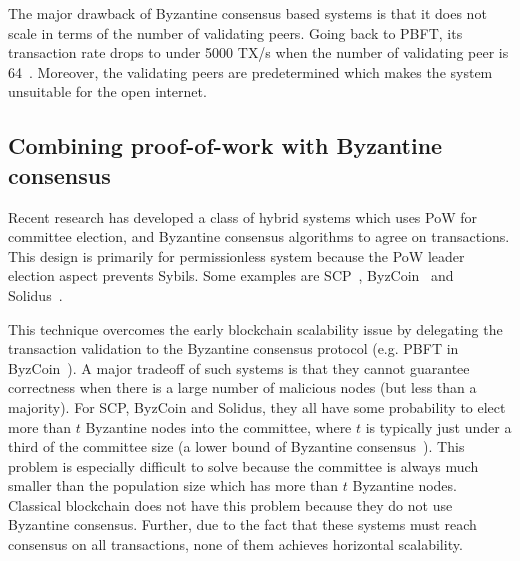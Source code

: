 The major drawback of Byzantine consensus based systems is that it does not scale in terms of the number of validating peers.
Going back to PBFT, its transaction rate drops to under 5000 TX/s when the number of validating peer is 64~\cite[Section 5.2]{miller2016honey}.
Moreover, the validating peers are predetermined which makes the system unsuitable for the open internet.



\subsection{Combining proof-of-work with Byzantine consensus}
Recent research has developed a class of hybrid systems which uses PoW for committee election,
and Byzantine consensus algorithms to agree on transactions.
This design is primarily for permissionless system because the PoW leader election aspect prevents Sybils.
Some examples are SCP~\cite{luu2015scp}, ByzCoin~\cite{kogias2016enhancing} and Solidus~\cite{abraham2016solidus}.

This technique overcomes the early blockchain scalability issue by delegating the transaction validation to the Byzantine consensus protocol (e.g. PBFT in ByzCoin~\cite{kogias2016enhancing}).
A major tradeoff of such systems is that they cannot guarantee correctness when there is a large number of malicious nodes (but less than a majority).
For SCP, ByzCoin and Solidus, they all have some probability to elect more than $t$ Byzantine nodes into the committee,
where $t$ is typically just under a third of the committee size (a lower bound of Byzantine consensus~\cite{pease1980reaching}).
This problem is especially difficult to solve because the committee is always much smaller than the population size which has more than $t$ Byzantine nodes.
Classical blockchain does not have this problem because they do not use Byzantine consensus.
Further, due to the fact that these systems must reach consensus on all transactions, none of them achieves horizontal scalability.

